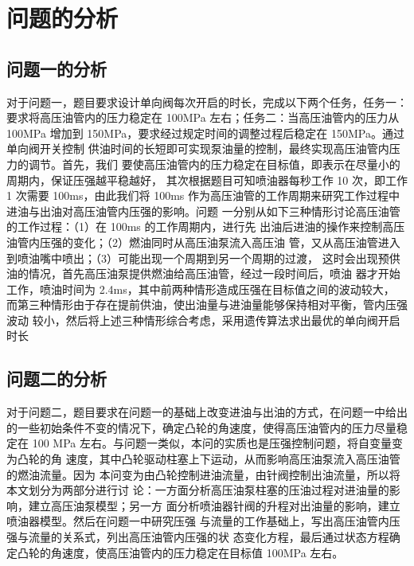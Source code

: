 \documentclass{cumcmthesis}
\begin{document}
\section{问题的分析}
\subsection{问题一的分析}
对于问题一，题目要求设计单向阀每次开启的时长，完成以下两个任务，任务一： 要求将高压油管内的压力稳定在 100MPa 左右；任务二：当高压油管内的压力从 100MPa 增加到 150MPa，要求经过规定时间的调整过程后稳定在 150MPa。通过单向阀开关控制 供油时间的长短即可实现泵油量的控制，最终实现高压油管内压力的调节。首先，我们 要使高压油管内的压力稳定在目标值，即表示在尽量小的周期内，保证压强越平稳越好， 其次根据题目可知喷油器每秒工作 10 次，即工作 1 次需要 100ms，由此我们将 100ms 作为高压油管的工作周期来研究工作过程中进油与出油对高压油管内压强的影响。问题 一分别从如下三种情形讨论高压油管的工作过程：（1）在 100ms 的工作周期内，进行先 出油后进油的操作来控制高压油管内压强的变化；（2）燃油同时从高压油泵流入高压油 管，又从高压油管进入到喷油嘴中喷出；（3）可能出现一个周期到另一个周期的过渡， 这时会出现预供油的情况，首先高压油泵提供燃油给高压油管，经过一段时间后，喷油 器才开始工作，喷油时间为 2.4ms，其中前两种情形造成压强在目标值之间的波动较大， 而第三种情形由于存在提前供油，使出油量与进油量能够保持相对平衡，管内压强波动 较小，然后将上述三种情形综合考虑，采用遗传算法求出最优的单向阀开启时长
\subsection{问题二的分析}
对于问题二，题目要求在问题一的基础上改变进油与出油的方式，在问题一中给出 的一些初始条件不变的情况下，确定凸轮的角速度，使得高压油管内的压力尽量稳定在 100 MPa 左右。与问题一类似，本问的实质也是压强控制问题，将自变量变为凸轮的角 速度，其中凸轮驱动柱塞上下运动，从而影响高压油泵流入高压油管的燃油流量。因为 本问变为由凸轮控制进油流量，由针阀控制出油流量，所以将本文划分为两部分进行讨 论：一方面分析高压油泵柱塞的压油过程对进油量的影响，建立高压油泵模型；另一方 面分析喷油器针阀的升程对出油量的影响，建立喷油器模型。然后在问题一中研究压强 与流量的工作基础上，写出高压油管内压强与流量的关系式，列出高压油管内压强的状 态变化方程，最后通过状态方程确定凸轮的角速度，使高压油管内的压力稳定在目标值 100MPa 左右。 
\end{document}
